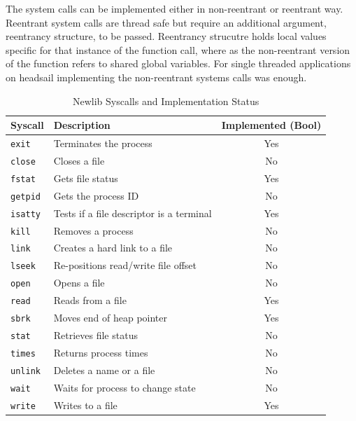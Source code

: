\documentclass[12pt,a4paper,english
]{tunithesis}
\begin{document}
The system calls can be implemented either in non-reentrant or reentrant way. Reentrant system calls are thread safe but require an additional argument, reentrancy structure, to be passed. Reentrancy strucutre holds local values specific for that instance of the function call, where as the non-reentrant version of the function refers to shared global variables. For single threaded applications on headsail implementing the non-reentrant systems calls was enough.~\cite{bennett2010porting}


\begin{table}[htbp]
\centering
\begin{tabular}{|l|l|c|}
\hline
\textbf{Syscall}       & \textbf{Description}               & \textbf{Implemented (Bool)} \\ \hline
\texttt{exit}         & Terminates the process             & Yes                       \\ \hline
\texttt{close}         & Closes a file                      & No                       \\ \hline
\texttt{fstat}         & Gets file status                   & Yes                       \\ \hline
\texttt{getpid}        & Gets the process ID                & No                       \\ \hline
\texttt{isatty}        & Tests if a file descriptor is a terminal & Yes                 \\ \hline
\texttt{kill}          & Removes a process                    & No                       \\ \hline
\texttt{link}          & Creates a hard link to a file      & No                       \\ \hline
\texttt{lseek}         & Re-positions read/write file offset & No                       \\ \hline
\texttt{open}          & Opens a file                       & No                       \\ \hline
\texttt{read}          & Reads from a file                  & Yes                       \\ \hline
\texttt{sbrk}          & Moves end of heap pointer          & Yes                       \\ \hline
\texttt{stat}          & Retrieves file status              & No                       \\ \hline
\texttt{times}         & Returns process times              & No                       \\ \hline
\texttt{unlink}        & Deletes a name or a file           & No                       \\ \hline
\texttt{wait}          & Waits for process to change state  & No                       \\ \hline
\texttt{write}         & Writes to a file                   & Yes                       \\ \hline
\end{tabular}
\caption{Newlib Syscalls and Implementation Status}
\label{tab:newlib_syscalls}
\end{table}
\end{document}
